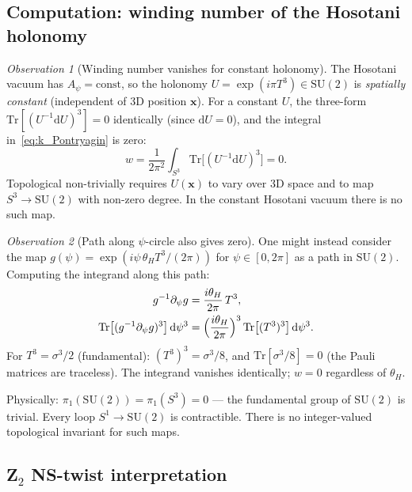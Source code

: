 \documentclass[11pt,a4paper]{article}
\theoremstyle{definition}
\theoremstyle{remark}
\newtheorem{observation}{Observation}
\begin{document}
\subsection{Computation: winding number of the Hosotani holonomy}

\begin{observation}[Winding number vanishes for constant holonomy]
  \label{obs:I2_constant}
  The Hosotani vacuum has $A_\psi = \mathrm{const}$, so the holonomy
  $U = \exp(i\pi T^3) \in \mathrm{SU}(2)$ is \emph{spatially constant}
  (independent of 3D position $\mathbf{x}$).
  For a constant $U$, the three-form $\mathrm{Tr}[(U^{-1}\mathrm{d}U)^3]
  = 0$ identically (since $\mathrm{d}U = 0$), and the integral
  in~\eqref{eq:k_Pontryagin} is zero:
  \begin{equation}
    w = \frac{1}{2\pi^2}\int_{S^3}
      \mathrm{Tr}\bigl[(U^{-1}\mathrm{d}U)^3\bigr] = 0.
    \label{eq:w_zero_constant}
  \end{equation}
  Topological non-trivially requires $U(\mathbf{x})$ to vary over 3D
  space and to map $S^3 \to \mathrm{SU}(2)$ with non-zero degree.
  In the constant Hosotani vacuum there is no such map.
\end{observation}

\begin{observation}[Path along $\psi$-circle also gives zero]
  \label{obs:I2_path}
  One might instead consider the map $g(\psi)
  = \exp(i\psi\,\theta_H T^3 / (2\pi))$ for $\psi \in [0,2\pi]$
  as a path in $\mathrm{SU}(2)$.
  Computing the integrand along this path:
  \begin{align}
    g^{-1}\partial_\psi g
    &= \frac{i\theta_H}{2\pi}\, T^3,
    \\
    \mathrm{Tr}\bigl[(g^{-1}\partial_\psi g)^3\bigr]\,\mathrm{d}\psi^3
    &= \Bigl(\frac{i\theta_H}{2\pi}\Bigr)^3\,
      \mathrm{Tr}\bigl[(T^3)^3\bigr]\,\mathrm{d}\psi^3.
  \end{align}
  For $T^3 = \sigma^3/2$ (fundamental): $(T^3)^3 = \sigma^3/8$, and
  $\mathrm{Tr}[\sigma^3/8] = 0$ (the Pauli matrices are traceless).
  The integrand vanishes identically; $w = 0$ regardless of $\theta_H$.

  Physically: $\pi_1(\mathrm{SU}(2)) = \pi_1(S^3) = 0$ — the
  fundamental group of $\mathrm{SU}(2)$ is trivial.  Every loop
  $S^1 \to \mathrm{SU}(2)$ is contractible.  There is no
  integer-valued topological invariant for such maps.
\end{observation}

\subsection{Z\texorpdfstring{$_2$}{2} NS-twist interpretation}
\end{document}
